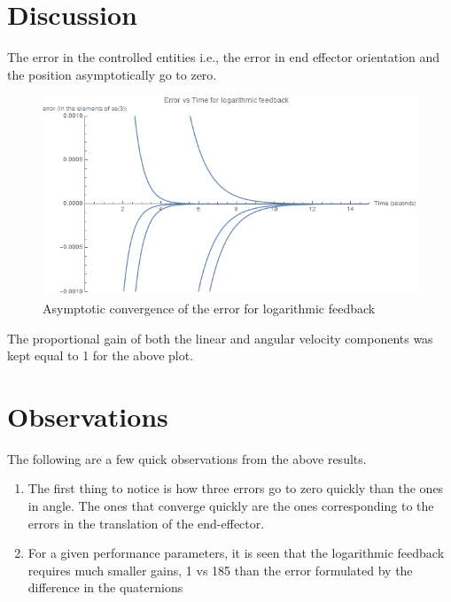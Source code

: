 \documentclass[a4paper,12pt]{article}
\begin{document}
\section{Discussion}
The error in the controlled entities i.e., the error in end effector orientation and the position asymptotically go to zero.
\begin{figure}[H]
	\centering
	\includegraphics[scale=0.7]{dqc_log_error}
	\caption{Asymptotic convergence of the error for logarithmic feedback}
	\label{fg:dqc_log_error}
\end{figure}
The proportional gain of both the linear and angular velocity components was kept equal to 1 for the above plot.
\section{Observations}
The following are a few quick observations from the above results.
\begin{enumerate}
	\item The first thing to notice is how three errors go to zero quickly than the ones in angle. The ones that converge quickly are the ones corresponding to the errors in the translation of the end-effector.
	\item For a given performance parameters, it is seen that the logarithmic feedback requires much smaller gains, 1 vs 185 than the error formulated by the difference in the quaternions
\end{enumerate}
\end{document}
